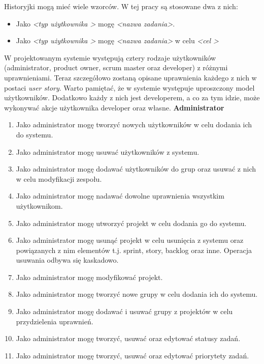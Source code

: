 Historyjki mogą mieć wiele wzorców. W tej pracy są stosowane dwa z nich:
\begin{itemize}
	\item Jako \textit{\textless typ użytkownika \textgreater} mogę \textit{\textless nazwa zadania\textgreater}.
	\item Jako \textit{\textless typ użytkownika \textgreater} mogę \textit{\textless nazwa zadania\textgreater} w celu \textit{\textless cel \textgreater}\cite{SCRUM}
\end{itemize} 

W projektowanym systemie występują cztery rodzaje użytkowników (administrator, product owner, scrum master oraz developer) z różnymi uprawnieniami. Teraz szczegółowo zostaną opisane uprawnienia każdego z nich w postaci \textit{user story}. Warto pamiętać, że w systemie występuje uproszczony model użytkowników. Dodatkowo każdy z nich jest developerem, a co za tym idzie, może wykonywać akcje użytkownika developer oraz własne.
	\newline
	\newline
	\textbf{Administrator}
	\begin{enumerate}	
		\item Jako administrator mogę tworzyć nowych użytkowników w celu dodania ich do systemu.
		\item Jako administrator mogę usuwać użytkowników z systemu.
		\item Jako administrator mogę dodawać użytkowników do grup oraz usuwać z nich w celu modyfikacji zespołu.
		\item Jako administrator mogę nadawać dowolne uprawnienia wszystkim użytkownikom.		
		\item Jako administrator mogę utworzyć projekt w celu dodania go do systemu.
		\item Jako administrator mogę usunąć projekt w celu usunięcia z systemu oraz powiązanych z nim elementów t.j. sprint, story, backlog oraz inne. Operacja usuwania odbywa się kaskadowo.
		\item Jako administrator mogę modyfikować projekt.		
		\item Jako administrator mogę tworzyć nowe grupy w celu dodania ich do systemu.		
		\item Jako administrator mogę dodawać i usuwać grupy z projektów w celu przydzielenia uprawnień.
		\item Jako administrator mogę tworzyć, usuwać oraz edytować statusy zadań.
		\item Jako administrator mogę tworzyć, usuwać oraz edytować priorytety zadań.
	\end{enumerate}		
